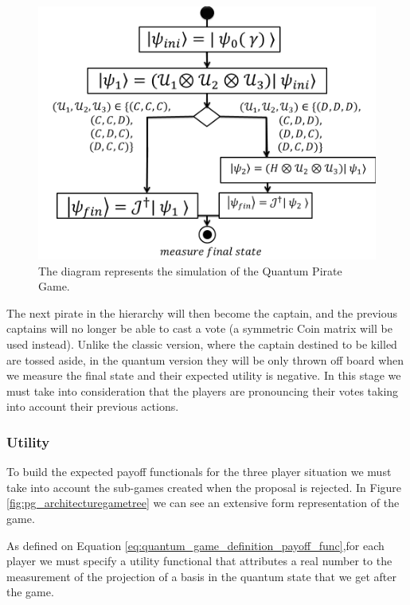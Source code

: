 \begin{figure}[h]
\centering 
\includegraphics[scale=0.50]{Figures/architecture/esquema/Slide5.png}
\caption{The diagram represents the simulation of the Quantum Pirate Game. }
\label{fig:pg_architecture3players_architecture}
\end{figure}

The next pirate in the hierarchy will then become the captain, and the previous captains will no longer be able to cast a vote (a symmetric Coin matrix will be used instead). 
Unlike the classic version, where the captain destined to be killed are tossed aside, in the quantum version they will be only thrown off board when we measure the final state and their expected utility is negative.
In this stage we must take into consideration that the players are pronouncing their votes taking into account their previous actions.




\subsubsection{Utility}
\label{subsec:pirates_utility}

To build the expected payoff functionals for the three player situation we must take into account the sub-games created when the proposal is rejected. In Figure \ref{fig:pg_architecturegametree} we can see an extensive form representation of the game.

As defined on Equation \ref{eq:quantum_game_definition_payoff_func},for each player we must specify a utility functional that attributes a real number to the measurement of the projection of a basis in the quantum state that we get after the game. 



